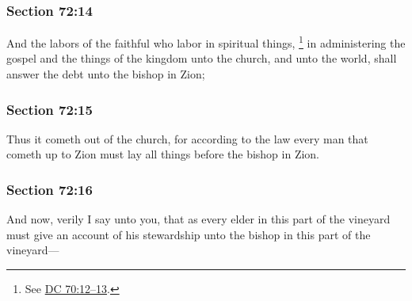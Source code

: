 	\subsubsection{Section 72:14} %
		\label{DC72-14}

		And the labors of the faithful who labor in spiritual things,%
			\footnote{%
				See \hyperref[DC70-12]{DC 70:12--13}.
				} 
		in administering the gospel and the things of the kingdom unto the church, and unto the world, shall answer the debt unto the bishop in Zion;


	\subsubsection{Section 72:15} %
		\label{DC72-15}

		Thus it cometh out of the church, for according to the law every man that cometh up to Zion must lay all things before the bishop in Zion.


	\subsubsection{Section 72:16} %
		\label{DC72-16}

		And now, verily I say unto you, that as every elder in this part of the vineyard must give an account of his stewardship unto the bishop in this part of the vineyard---


